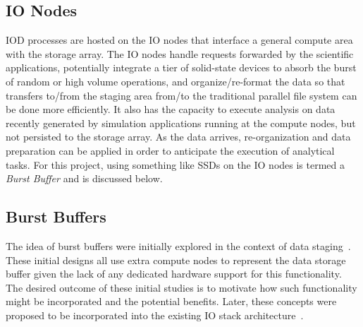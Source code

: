 \documentclass{sig-alt-gov2}
\begin{document}
\subsection{IO Nodes}
IOD processes are hosted on the IO nodes that interface a general compute area
with the storage array. The IO nodes handle requests forwarded by the
scientific applications, potentially integrate a tier of solid-state devices to
absorb the burst of random or high volume operations, and organize/re-format
the data so that transfers to/from the staging area from/to the traditional
parallel file system can be done more efficiently. It also has the capacity to
execute analysis on data recently generated by simulation applications running
at the compute nodes, but not persisted to the storage array. As the data
arrives, re-organization and data preparation can be applied in order to
anticipate the execution of analytical tasks.
%
%
For this
project, using something like SSDs on the IO nodes is termed a {\em Burst
Buffer} and is discussed below.

\subsection{Burst Buffers}
\label{sec:burst}

The idea of burst buffers were initially explored in the context of data
staging~\cite{abbasi:2007:datatap,Abbasi:2009:datatap,nisar:2008:staging,zheng:2010:predata}.
These initial designs all use extra compute nodes to represent the data storage
buffer given the lack of any dedicated hardware support for this functionality.
The desired outcome of these initial studies is to motivate how such
functionality might be incorporated and the potential benefits.  Later, these
concepts were proposed to be incorporated into the existing IO stack
architecture~\cite{nowoczynski:2008:zest,bent:2012:challenges,bent:2012:burst-buffer}.
\end{document}
